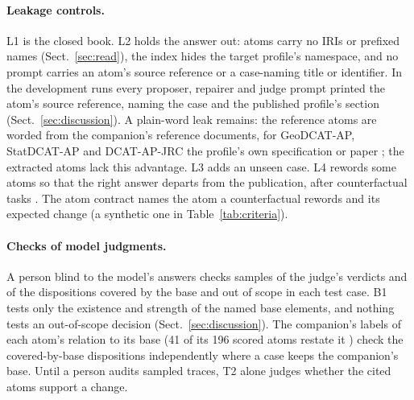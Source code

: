 \paragraph{Leakage controls.} L1 is the closed book. L2 holds the answer out: atoms carry no \acp{IRI} or prefixed
names (Sect.~\ref{sec:read}), the index hides the target profile's namespace, and no prompt carries an atom's
source reference or a case-naming title or identifier.
 In the development runs every proposer, repairer and judge prompt printed the
atom's source reference, naming the case and the published profile's section (Sect.~\ref{sec:discussion}).
 A plain-word leak remains: the reference atoms are worded from the companion's
reference documents, for GeoDCAT-AP, StatDCAT-AP and DCAT-AP-JRC the profile's own specification or paper
\cite{anon2027rq1}; the extracted atoms lack this advantage. %
L3 adds an unseen case.  L4 rewords some atoms so that the right answer departs
from the publication, after counterfactual tasks \cite{wu2024reciting}. The atom contract names the atom a
counterfactual rewords and its expected change (a synthetic one in Table~\ref{tab:criteria}).

\paragraph{Checks of model judgments.} A person blind to the model's answers checks samples of the judge's
verdicts and of the dispositions covered by the base and out of scope in each test case.  B1 tests only the existence and strength of the named base elements, and nothing tests an
out-of-scope decision (Sect.~\ref{sec:discussion}).
The companion's labels of each atom's relation to its base (41 of its 196 scored atoms restate it
\cite{anon2027rq1}) check the covered-by-base dispositions independently where a case keeps the companion's base.
 Until a person audits sampled traces, T2 alone judges whether the cited
atoms support a change. 

